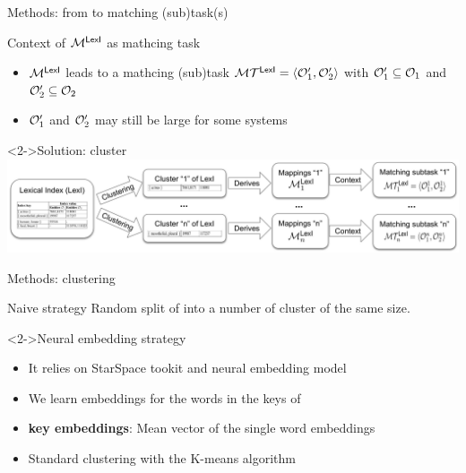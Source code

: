 \documentclass[t]{beamer}
\begin{document}
\begin{frame}{Methods: from \lex to matching (sub)task(s)}

\begin{block}{Context of $\mathcal{M}^{\textsf{LexI}}$ as mathcing task}

\begin{itemize}
  \item $\mathcal{M}^{\textsf{LexI}}$ leads to a mathcing (sub)task $\mathcal{M}\mathcal{T}^{\textsf{LexI}}=\langle \mathcal{O}_1', \mathcal{O}_2' \rangle$
with $\mathcal{O}_1' \subseteq \mathcal{O}_1$ and $\mathcal{O}_2' \subseteq \mathcal{O}_2$
  \item $\mathcal{O}_1'$ and $\mathcal{O}_2'$ may still be large for some systems 
\end{itemize}

\end{block}


\begin{block}<2->{Solution: cluster \lex}
\includegraphics[width=1.0\textwidth]{figures/workflow_clustering.png}
\end{block}

\end{frame}



\begin{frame}{Methods: clustering}
	
	\begin{block}{Naive strategy}
		Random split of \lex into a number of cluster of the same size.
	\end{block}
	
	
	\begin{block}<2->{Neural embedding strategy}
	\begin{itemize}
	  \item It relies on StarSpace tookit and neural embedding model
	  \item We learn embeddings for the words in the keys of \lex
	  \item \textbf{\lex key embeddings}: Mean vector of the single word 
	  embeddings 
	  \item Standard clustering with the K-means algorithm
	\end{itemize}
	
	\end{block}
	
	
  	
\end{frame}
\end{document}
